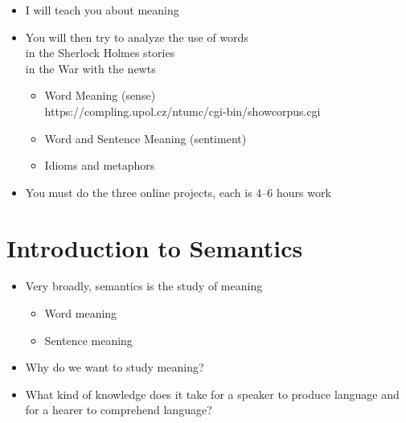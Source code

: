 \documentclass[a4paper,landscape,headrule,footrule,xetex,25pt]{foils}
\begin{document}

\begin{itemize}
\item I will teach you about meaning
\item You will then try to analyze the use of words 
  \\ in the Sherlock Holmes stories
  \\ in the War with the newts
  \begin{itemize}
  \item Word Meaning (sense)
    \\   https://compling.upol.cz/ntumc/cgi-bin/showcorpus.cgi
    \\  
  \item Word and Sentence Meaning (sentiment)
    \\  
  \item Idioms and metaphors
    \\ 
  \end{itemize}
\item You must do the three online projects, each is 4--6 hours work

\end{itemize}











\section{Introduction to Semantics}

\begin{itemize}
\item Very broadly, semantics is the study of meaning
  \begin{itemize}
  \item Word meaning
  \item Sentence meaning
  \end{itemize}
\item Why do we want to study meaning?
\item What kind of knowledge does it take for a speaker to produce language and for a hearer to comprehend language? 
\end{itemize}
\end{document}
